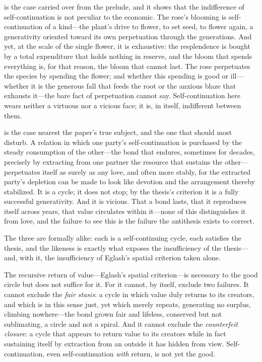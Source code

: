  is the case carried over from the prelude, and it shows that the indifference of self-continuation is not peculiar to the economic. The rose's blooming is self-continuation of a kind---the plant's drive to flower, to set seed, to flower again, a generativity oriented toward its own perpetuation through the generations. And yet, at the scale of the single flower, it is exhaustive: the resplendence is bought by a total expenditure that holds nothing in reserve, and the bloom that spends everything is, for that reason, the bloom that cannot last. The rose perpetuates the species by spending the flower; and whether this spending is good or ill---whether it is the generous fall that feeds the root or the anxious blaze that exhausts it---the bare fact of perpetuation cannot say. Self-continuation here wears neither a virtuous nor a vicious face; it is, in itself, indifferent between them.

 is the case nearest the paper's true subject, and the one that should most disturb. A relation in which one party's self-continuation is purchased by the steady consumption of the other---the bond that endures, sometimes for decades, precisely by extracting from one partner the resource that sustains the other---perpetuates itself as surely as any love, and often more stably, for the extracted party's depletion can be made to look like devotion and the arrangement thereby stabilized. It is a cycle; it does not stop; by the thesis's criterion it is a fully successful generativity. And it is vicious. That a bond lasts, that it reproduces itself across years, that value circulates within it---none of this distinguishes it from love, and the failure to see this is the failure the antithesis exists to correct.

The three are formally alike: each is a self-continuing cycle, each satisfies the thesis, and the likeness is exactly what exposes the insufficiency of the thesis---and, with it, the insufficiency of Eglash's spatial criterion taken alone.

\begin{claim}
The recursive return of value---Eglash's spatial criterion---is necessary to the good circle but does not suffice for it. For it cannot, by itself, exclude two failures. It cannot exclude the \emph{fair stasis}: a cycle in which value duly returns to its creators, and which is in this sense just, yet which merely repeats, generating no surplus, climbing nowhere---the bond grown fair and lifeless, conserved but not sublimating, a circle and not a spiral. And it cannot exclude the \emph{counterfeit closure}: a cycle that appears to return value to its creators while in fact sustaining itself by extraction from an outside it has hidden from view. Self-continuation, even self-continuation \emph{with} return, is not yet the good.
\end{claim}

